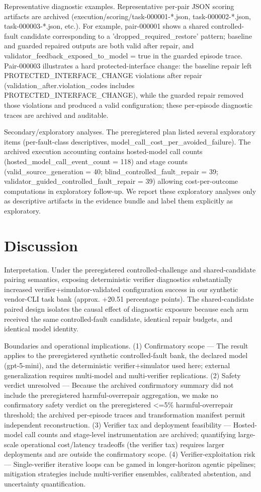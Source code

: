 \documentclass[conference]{IEEEtran}
\begin{document}
Representative diagnostic examples. Representative per-pair JSON scoring artifacts are archived (execution/scoring/task-000001-*.json, task-000002-*.json, task-000003-*.json, etc.). For example, pair-000001 shows a shared controlled-fault candidate corresponding to a 'dropped\_required\_restore' pattern; baseline and guarded repaired outputs are both valid after repair, and validator\_feedback\_exposed\_to\_model = true in the guarded episode trace. Pair-000003 illustrates a hard protected-interface change: the baseline repair left PROTECTED\_INTERFACE\_CHANGE violations after repair (validation\_after.violation\_codes includes PROTECTED\_INTERFACE\_CHANGE), while the guarded repair removed those violations and produced a valid configuration; these per-episode diagnostic traces are archived and auditable.

Secondary/exploratory analyses. The preregistered plan listed several exploratory items (per-fault-class descriptives, model\_call\_cost\_per\_avoided\_failure). The archived execution accounting contains hosted-model call counts (hosted\_model\_call\_event\_count = 118) and stage counts (valid\_source\_generation = 40; blind\_controlled\_fault\_repair = 39; validator\_guided\_controlled\_fault\_repair = 39) allowing cost-per-outcome computations in exploratory follow-up. We report these exploratory analyses only as descriptive artifacts in the evidence bundle and label them explicitly as exploratory.

\section{Discussion}
Interpretation. Under the preregistered controlled-challenge and shared-candidate pairing semantics, exposing deterministic verifier diagnostics substantially increased verifier+simulator-validated configuration success in our synthetic vendor-CLI task bank (approx. +20.51 percentage points). The shared-candidate paired design isolates the causal effect of diagnostic exposure because each arm received the same controlled-fault candidate, identical repair budgets, and identical model identity.

Boundaries and operational implications. (1) Confirmatory scope --- The result applies to the preregistered synthetic controlled-fault bank, the declared model (gpt-5-mini), and the deterministic verifier+simulator used here; external generalization requires multi-model and multi-verifier replications. (2) Safety verdict unresolved --- Because the archived confirmatory summary did not include the preregistered harmful-overrepair aggregation, we make no confirmatory safety verdict on the preregistered <=5\% harmful-overrepair threshold; the archived per-episode traces and transformation manifest permit independent reconstruction. (3) Verifier tax and deployment feasibility --- Hosted-model call counts and stage-level instrumentation are archived; quantifying large-scale operational cost/latency tradeoffs (the verifier tax) requires larger deployments and are outside the confirmatory scope. (4) Verifier-exploitation risk --- Single-verifier iterative loops can be gamed in longer-horizon agentic pipelines; mitigation strategies include multi-verifier ensembles, calibrated abstention, and uncertainty quantification.
\end{document}
